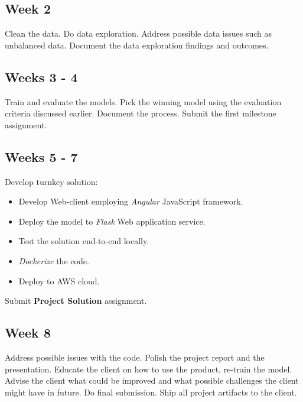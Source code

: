 \hypertarget{week-2}{%
\subsection{Week 2}\label{week-2}}

Clean the data. Do data exploration. Address possible data issues such
as unbalanced data. Document the data exploration findings and outcomes.

\hypertarget{weeks-3---4}{%
\subsection{Weeks 3 - 4}\label{weeks-3---4}}

Train and evaluate the models. Pick the winning model using the
evaluation criteria discussed earlier. Document the process. Submit the
first milestone assignment.

\hypertarget{weeks-5---7}{%
\subsection{Weeks 5 - 7}\label{weeks-5---7}}

Develop turnkey solution:

\begin{itemize}
\tightlist
\item
  Develop Web-client employing \emph{Angular} JavaScript framework.
\item
  Deploy the model to \emph{Flask} Web application service.
\item
  Test the solution end-to-end locally.
\item
  \emph{Dockerize} the code.
\item
  Deploy to AWS cloud.
\end{itemize}

Submit \textbf{Project Solution} assignment.

\hypertarget{week-8}{%
\subsection{Week 8}\label{week-8}}

Address possible issues with the code. Polish the project report and the
presentation. Educate the client on how to use the product, re-train the
model. Advise the client what could be improved and what possible
challenges the client might have in future. Do final submission. Ship
all project artifacts to the client.



